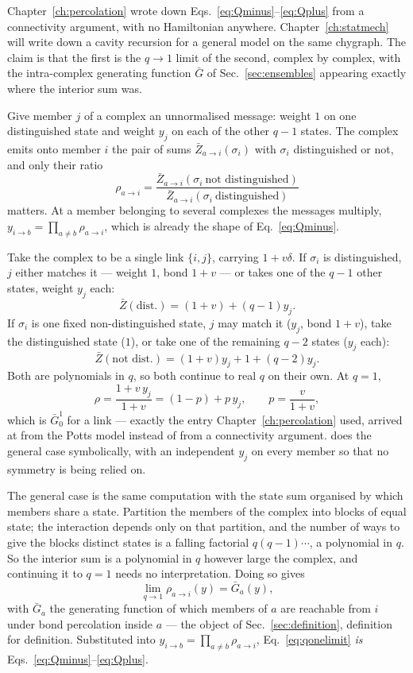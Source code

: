 Chapter~\ref{ch:percolation} wrote down
Eqs.~\eqref{eq:Qminus}--\eqref{eq:Qplus} from a connectivity argument, with no
Hamiltonian anywhere. Chapter~\ref{ch:statmech} will write down a cavity
recursion for a general model on the same chygraph. The claim is that the first
is the $q\to1$ limit of the second, complex by complex, with the intra-complex
generating function $\bar G$ of Sec.~\ref{sec:ensembles} appearing exactly where
the interior sum was.

Give member $j$ of a complex an unnormalised message: weight $1$ on one
distinguished state and weight $y_{j}$ on each of the other $q-1$ states. The
complex emits onto member $i$ the pair of sums $\bar{Z}_{a\to i}(\sigma_{i})$ with
$\sigma_{i}$ distinguished or not, and only their ratio
\[
  \rho_{a\to i}=\frac{\bar{Z}_{a\to i}(\sigma_{i}\ \text{not distinguished})}
                     {\bar{Z}_{a\to i}(\sigma_{i}\ \text{distinguished})}
\]
matters. At a member belonging to several complexes the messages multiply,
$y_{i\to b}=\prod_{a\ne b}\rho_{a\to i}$, which is already the shape of
Eq.~\eqref{eq:Qminus}.

Take the complex to be a single link $\{i,j\}$, carrying $1+v\delta$. If
$\sigma_{i}$ is distinguished, $j$ either matches it --- weight $1$, bond
$1+v$ --- or takes one of the $q-1$ other states, weight $y_{j}$ each:
\[
  \bar{Z}(\text{dist.})=(1+v)+(q-1)y_{j}.
\]
If $\sigma_{i}$ is one fixed non-distinguished state, $j$ may match it
($y_{j}$, bond $1+v$), take the distinguished state ($1$), or take one of the
remaining $q-2$ states ($y_{j}$ each):
\[
  \bar{Z}(\text{not dist.})=(1+v)y_{j}+1+(q-2)y_{j}.
\]
Both are polynomials in $q$, so both continue to real $q$ on their own. At
$q=1$,
\[
  \rho=\frac{1+v\,y_{j}}{1+v}=(1-p)+p\,y_{j},
  \qquad p=\frac{v}{1+v},
\]
which is $\bar G^{1}_{0}$ for a link --- exactly the entry
Chapter~\ref{ch:percolation} used, arrived at from the Potts model instead of
from a connectivity argument.  does the general case symbolically, with an independent $y_{j}$ on every member so that no symmetry is being relied on.

The general case is the same computation with the state sum organised by which
members share a state. Partition the members of the complex into blocks of
equal state; the interaction depends only on that partition, and the number of
ways to give the blocks distinct states is a falling factorial
$q(q-1)\cdots$, a polynomial in $q$. So the interior sum is a polynomial in $q$
however large the complex, and continuing it to $q=1$ needs no interpretation.
Doing so gives
\begin{equation}
  \lim_{q\to1}\rho_{a\to i}(y)=\bar G_{a}(y),
  \label{eq:qonelimit}
\end{equation}
with $\bar G_{a}$ the generating function of which members of $a$ are reachable
from $i$ under bond percolation inside $a$ --- the object of
Sec.~\ref{sec:definition}, definition for definition. Substituted into
$y_{i\to b}=\prod_{a\ne b}\rho_{a\to i}$, Eq.~\eqref{eq:qonelimit} \emph{is}
Eqs.~\eqref{eq:Qminus}--\eqref{eq:Qplus}.

